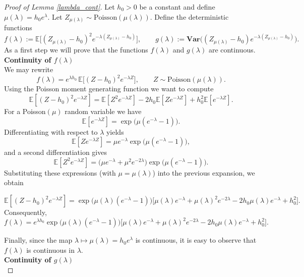 \documentclass[10pt,a4paper]{amsart}
\begin{document}
\begin{proof}[Proof of Lemma \ref{lambda_cont}]
Let $h_0>0$ be a constant and define $\mu(\lambda)=h_0 e^{\lambda}$. Let
$Z_{\mu(\lambda)} \sim \mathrm{Poisson}(\mu(\lambda))$. Define the deterministic functions
\[
f(\lambda):=\mathbb{E}\Big[(Z_{\mu(\lambda)}-h_0)^2e^{-\lambda(Z_{\mu(\lambda)}-h_0)}\Big],
\qquad
g(\lambda):=\mathbf{Var}\Big((Z_{\mu(\lambda)}-h_0)e^{-\lambda(Z_{\mu(\lambda)}-h_0)}\Big).
\] As a first step we will prove that the functions $f(\lambda)$ and $g(\lambda)$ are continuous.\\

\textbf{Continuity of $f(\lambda)$}\\


We may rewrite
\[
f(\lambda)
= e^{\lambda h_0}\,\mathbb{E}\Big[(Z-h_0)^2 e^{-\lambda Z}\Big],
\qquad Z\sim \mathrm{Poisson}(\mu(\lambda)).
\]
Using the Poisson moment generating function we want to compute
\[
\mathbb{E}[(Z-h_0)^2 e^{-\lambda Z}]
= \mathbb{E}[Z^2 e^{-\lambda Z}]
-2h_0 \mathbb{E}[Z e^{-\lambda Z}]
+ h_0^2 \mathbb{E}[e^{-\lambda Z}].
\]
For a Poisson$(\mu)$ random variable we have
\[
\mathbb{E}[e^{-\lambda Z}]
= \exp\!\big(\mu(e^{-\lambda}-1)\big).
\]
Differentiating with respect to $\lambda$ yields
\[
\mathbb{E}[Z e^{-\lambda Z}]
= \mu e^{-\lambda}
\exp\!\big(\mu(e^{-\lambda}-1)\big),
\]
and a second differentiation gives
\[
\mathbb{E}[Z^2 e^{-\lambda Z}]
= \big(\mu e^{-\lambda}+\mu^2 e^{-2\lambda}\big)
\exp\!\big(\mu(e^{-\lambda}-1)\big).
\]
Substituting these expressions (with $\mu=\mu(\lambda)$) into the
previous expansion, we obtain

\[\mathbb{E}[(Z-h_0)^2 e^{-\lambda Z}]
= \exp\!\big(\mu(\lambda)(e^{-\lambda}-1)\big)
\Big[
\mu(\lambda)e^{-\lambda}
+ \mu(\lambda)^2 e^{-2\lambda}
-2h_0 \mu(\lambda)e^{-\lambda}
+ h_0^2
\Big].\]
Consequently,
\[
f(\lambda)
= e^{\lambda h_0}
\exp\!\big(\mu(\lambda)(e^{-\lambda}-1)\big)
\Big[
\mu(\lambda)e^{-\lambda}
+ \mu(\lambda)^2 e^{-2\lambda}
-2h_0 \mu(\lambda)e^{-\lambda}
+ h_0^2
\Big].
\]

Finally, since the map $\lambda\mapsto \mu(\lambda)=h_0 e^{\lambda}$ is continuous, it is easy to observe that $f(\lambda)$ is continuous in $\lambda$.\\ 

\textbf{Continuity of $g(\lambda)$}\\


\end{proof}
\end{document}
